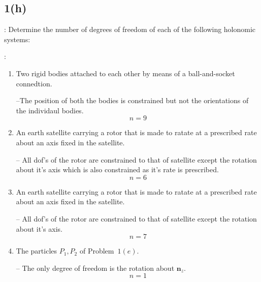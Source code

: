 \subsection{1(h)}

: Determine the number of degrees of freedom of each of the following holonomic systems:

:

\begin{enumerate}
    \item Two rigid bodies attached to each other by means of a ball-and-socket connedtion.

    --The position of both the bodies is constrained but not the orientations of the individaul bodies.
    $$n=9$$

    \item An earth satellite carrying a rotor that is made to ratate at a prescribed rate about an axis fixed in the satellite.

    -- All dof's of the rotor are constrained to that of satellite except the rotation about it's axis which is also constrained as it's rate is prescribed.
    $$n = 6$$

    \item An earth satellite carrying a rotor that is made to ratate at a prescribed rate about an axis fixed in the satellite.

    -- All dof's of the rotor are constrained to that of satellite except the rotation about it's axis.
    $$n = 7$$

    \item The particles $P_1, P_2$ of Problem~$1(e)$.

    -- The only degree of freedom is the rotation about $\pmb n_z$.
    $$n=1$$
\end{enumerate}
